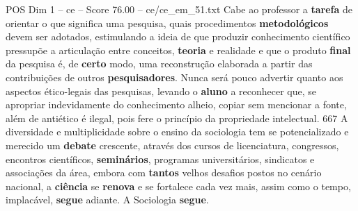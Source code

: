 \begin{textsample}{POS Dim 1 – ce – Score 76.00 – ce/ce\_em\_51.txt}
Cabe ao professor a \textbf{tarefa} de orientar o que significa uma pesquisa, quais procedimentos \textbf{metodológicos} devem ser adotados, estimulando a ideia de que produzir conhecimento científico pressupõe a articulação entre conceitos, \textbf{teoria} e realidade e que o produto \textbf{final} da pesquisa é, de \textbf{certo} modo, uma reconstrução elaborada a partir das contribuições de outros \textbf{pesquisadores}.
Nunca será pouco advertir quanto aos aspectos ético-legais das pesquisas, levando o \textbf{aluno} a reconhecer que, se apropriar indevidamente do conhecimento alheio, copiar sem mencionar a fonte, além de antiético é ilegal, pois fere o princípio da propriedade intelectual. 667 A diversidade e multiplicidade sobre o ensino da sociologia tem se potencializado e merecido um \textbf{debate} crescente, através dos cursos de licenciatura, congressos, encontros científicos, \textbf{seminários}, programas universitários, sindicatos e associações da área, embora com \textbf{tantos} velhos desafios postos no cenário nacional, a \textbf{ciência} se \textbf{renova} e se fortalece cada vez mais, assim como o tempo, implacável, \textbf{segue} adiante.
A Sociologia \textbf{segue}.

\end{textsample}
